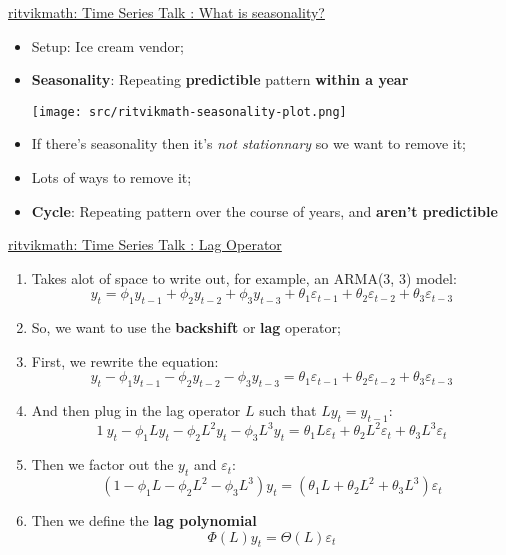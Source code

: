 \documentclass[12pt, titlepage, french]{report}
\begin{document}
\begin{YTB_SUMM}{\href{https://www.youtube.com/watch?v=4hrMdu9CSQs&list=PLvcbYUQ5t0UHOLnBzl46_Q6QKtFgfMGc3&index=10}{ritvikmath: Time Series Talk : What is seasonality?}}
\begin{itemize}	
	\item	Setup: Ice cream vendor;
	\item	\textbf{Seasonality}: Repeating \textbf{predictible} pattern \textbf{within a year}
	
	\texttt{[image: src/ritvikmath-seasonality-plot.png]}
	\item	If there's seasonality then it's \textit{not stationnary} so we want to remove it;
	\item[]	Lots of ways to remove it;
	
	\item	\textbf{Cycle}: Repeating pattern over the course of years, and \textbf{aren't predictible}
\end{itemize}
\end{YTB_SUMM}

\begin{YTB_SUMM}{\href{https://www.youtube.com/watch?v=VPNijQ2L3XM}{ritvikmath: Time Series Talk : Lag Operator}}
\begin{enumerate}
	\item	Takes alot of space to write out, for example, an ARMA(3, 3) model:
	\begin{equation*}
	y_{t} = \phi_{1}y_{t - 1} + \phi_{2}y_{t - 2} + \phi_{3}y_{t - 3} + \theta_{1} \varepsilon_{t - 1} + \theta_{2} \varepsilon_{t - 2} + \theta_{3} \varepsilon_{t - 3}
	\end{equation*}
	\item	So, we want to use the \textbf{backshift} or \textbf{lag} operator;
	\item	First, we rewrite the equation:
	\begin{equation*}
	y_{t} - \phi_{1}y_{t - 1} - \phi_{2}y_{t - 2} - \phi_{3}y_{t - 3} = \theta_{1} \varepsilon_{t - 1} + \theta_{2} \varepsilon_{t - 2} + \theta_{3} \varepsilon_{t - 3}
	\end{equation*}
	\item	And then plug in the lag operator $L$ such that $L y_{t} = y_{t - 1}$:
	\begin{equation*}
	1 \ y_{t} - \phi_{1} L y_{t} - \phi_{2} L^{2} y_{t} - \phi_{3} L^{3} y_{t} 
	= 
	\theta_{1} L \varepsilon_{t} + \theta_{2} L^{2} \varepsilon_{t} + \theta_{3} L^{3} \varepsilon_{t}
	\end{equation*}
	\item	Then we factor out the $y_{t}$ and $\varepsilon_{t}$:
	\begin{equation*}
	(1 - \phi_{1} L - \phi_{2} L^{2} - \phi_{3} L^{3}) y_{t} 
	= 
	(\theta_{1} L + \theta_{2} L^{2} + \theta_{3} L^{3}) \varepsilon_{t}
	\end{equation*}
	\item	Then we define the \textbf{lag polynomial}
	\begin{equation*}
	\Phi(L) y_{t} 
	= 
	\Theta(L) \varepsilon_{t}
	\end{equation*}
\end{enumerate}
\end{YTB_SUMM}
\end{document}
